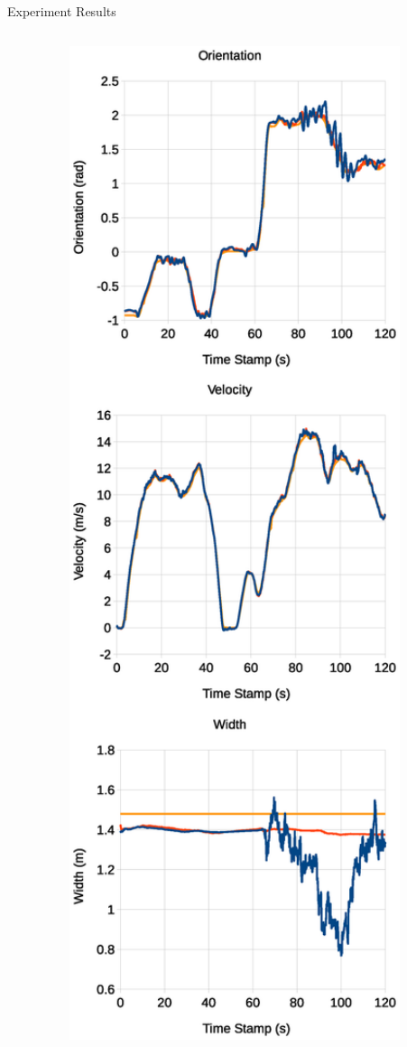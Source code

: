 \documentclass[final,hyperref={pdfpagelabels=false}]{beamer}
\begin{document}
\begin{frame}[t]
\begin{columns}[t]
\begin{column}{.48\textwidth}
\begin{block}{Experiment Results}
\begin{columns}[t]
\begin{column}{0.18\textwidth}
\begin{figure}
  \includegraphics[width=1\textwidth]{./img/ground-truth.eps}

\end{figure}
\end{column}
\end{columns}
\end{block}
\end{column}
\end{columns}
\end{frame}
\end{document}
